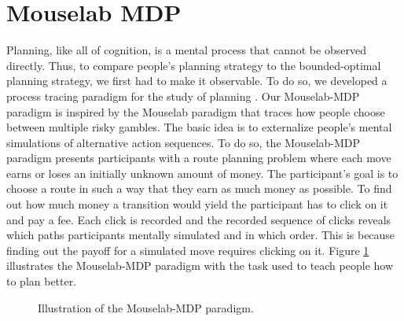 
\section{Mouselab MDP}
\label{sec:mouselab_mdp}

Planning, like all of cognition, is a mental process that cannot be observed directly. Thus, to compare people's planning strategy to the bounded-optimal planning strategy, we first had to make it observable. To do so, we developed a process tracing paradigm for the study of planning \cite{CallawayLiederKrueger2017}. Our Mouselab-MDP paradigm is inspired by the Mouselab paradigm \citep{Payne1993} that traces how people choose between multiple risky gambles. The basic idea is to externalize people's mental simulations of alternative action sequences. To do so, the Mouselab-MDP paradigm presents participants with a route planning problem where each move earns or loses an initially unknown amount of money. The participant's goal is to choose a route in such a way that they earn as much money as possible. To find out how much money a transition would yield the participant has to click on it and pay a fee. Each click is recorded and the recorded sequence of clicks reveals which paths participants mentally simulated and in which order. This is because finding out the payoff for a simulated move requires clicking on it. Figure \ref{fig:MouselabMDP} illustrates the Mouselab-MDP paradigm with the task used to teach people how to plan better.

\begin{figure}
    \label{fig:MouselabMDP}
    \caption{Illustration of the Mouselab-MDP paradigm.}
\end{figure}
